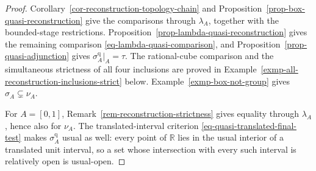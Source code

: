 \documentclass[preprint,3p]{elsarticle}
\theoremstyle{plain}
\theoremstyle{definition}
\numberwithin{equation}{section}
\begin{document}
\begin{proof}
Corollary~\ref{cor-reconstruction-topology-chain} and
Proposition~\ref{prop-box-quasi-reconstruction} give the comparisons
through $\lambda_A$, together with the bounded-stage restrictions.
Proposition~\ref{prop-lambda-quasi-reconstruction} gives the
remaining comparison \eqref{eq-lambda-quasi-comparison}, and
Proposition~\ref{prop-quasi-adjunction} gives
$\sigma_A^{\mathrm q}|_A=\tau$.
The rational-cube comparison and the simultaneous strictness of
all four inclusions are proved in
Example~\ref{exmp-all-reconstruction-inclusions-strict} below.
Example~\ref{exmp-box-not-group} gives $\sigma_A\subsetneq\nu_A$.

For $A=[0,1]$, Remark~\ref{rem-reconstruction-strictness} gives
equality through $\lambda_A$, hence also for $\nu_A$.
The translated-interval criterion
\eqref{eq-quasi-translated-final-test} makes
$\sigma_A^{\mathrm q}$ usual as well: every point of $\mathbb R$
lies in the usual interior of a translated unit interval, so a set
whose intersection with every such interval is relatively open is
usual-open.
\end{proof}
\end{document}
